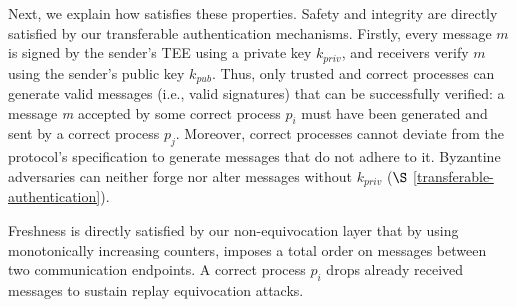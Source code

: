 
Next, we explain how \projecttitle{} satisfies these properties. 
Safety and integrity are directly satisfied by our transferable authentication mechanisms. Firstly, every message $m$ is signed by the sender’s TEE using a private key $k_{priv}$, and receivers verify $m$ using the sender’s public key $k_{pub}$. Thus, only trusted and correct processes can generate valid messages (i.e., valid signatures) that can be successfully verified: a message \textit{m} accepted by some correct process $p_i$ must have been generated and sent by a correct process $p_j$. Moreover, correct processes cannot deviate from the protocol's specification to generate messages that do not adhere to it.  Byzantine adversaries can neither forge nor alter messages without $k_{priv}$ ($\S$ \ref{transferable-authentication}).



Freshness is directly satisfied by our non-equivocation layer that by using monotonically increasing counters, imposes a total order on messages between two communication endpoints. A correct process $p_i$ drops already received messages to sustain replay equivocation attacks. 



